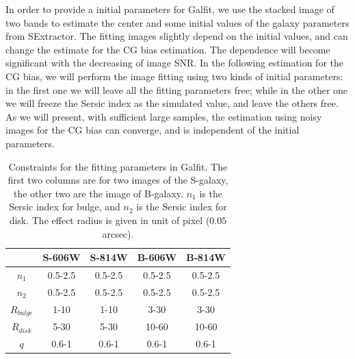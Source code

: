\documentclass[useAMS,usenatbib]{mn2e}
\begin{document}
In order to provide a initial parameters for Galfit, we use the
stacked image of two bands to estimate the center and some initial
values of the galaxy parameters from SExtractor. The fitting images
slightly depend on the initial values, and can change the estimate for
the CG bias estimation. The dependence will become significant with
the decreasing of image SNR. In the following estimation for the CG
bias, we will perform the image fitting using two kinds of initial
parameters: in the first one we will leave all the fitting parameters
free; while in the other one we will freeze the Sersic index as the
simulated value, and leave the others free. As we will present,
with sufficient large samples, the estimation using noisy images for the
CG bias can converge, and is independent of the initial parameters.

%
\begin{center}
\begin{table}
\begin{tabular}{|c|c|c|c|c|}
\hline\hline
 &S-606W  & S-814W  & B-606W & B-814W \\ \hline
$n_1$ &0.5-2.5  &0.5-2.5  &0.5-2.5 &0.5-2.5 \\ \hline
$n_2$ &0.5-2.5  &0.5-2.5  &0.5-2.5 &0.5-2.5 \\ \hline
$R_{bulge}$ &1-10 &1-10  &3-30  &3-30  \\ \hline
$R_{disk}$  &5-30 &5-30  &10-60 &10-60 \\ \hline
$q$      &0.6-1  &0.6-1  &0.6-1 &0.6-1 \\ \hline
\hline
\end{tabular}
\caption{\label{fitpar} Constraints for the fitting parameters in Galfit.
The first two columns are for two images of the S-galaxy, the other two are
the image of B-galaxy.
$n_1$ is the Sersic index for bulge, and $n_2$ is the Sersic index for disk.
The effect radius is given in unit of pixel ($0.05$ arcsec).}
\end{table}
\end{center}
%
\end{document}
